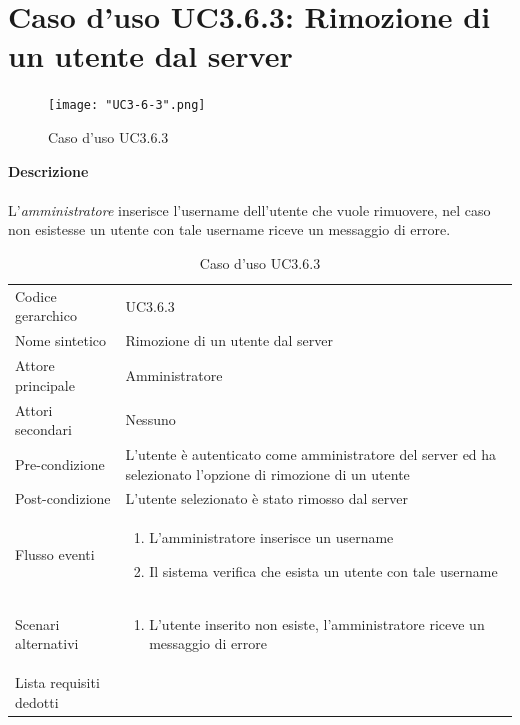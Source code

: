 \documentclass[a4paper]{report}
\begin{document}
	 \section{Caso d'uso UC3.6.3: Rimozione di un utente dal server}
	 \begin{figure}[H]
			\centering
			\texttt{[image: "UC3-6-3".png]}
			\caption{Caso d'uso UC3.6.3}
		\end{figure}
	 \textbf{Descrizione} \\ \\
	 L'\emph{amministratore} inserisce l'username dell'utente che vuole rimuovere, nel caso non esistesse
	  un utente con tale username riceve un messaggio di errore. \\
		\begin{table}[H]
		\begin{tabularx}{\textwidth}{X | X}\toprule
			\rowcolor{orange!65}Codice gerarchico & UC3.6.3 \\
			Nome sintetico & Rimozione di un utente dal server \\
			\rowcolor{orange!65}Attore principale & Amministratore\\
			Attori secondari & Nessuno \\
			\rowcolor{orange!65}Pre-condizione & L'utente è autenticato come amministratore del server ed
			 ha selezionato l'opzione di rimozione di un utente\\
			Post-condizione & L'utente selezionato è stato rimosso dal server\\
			\rowcolor{orange!65}Flusso eventi & \begin{enumerate}
			\item L'amministratore inserisce un username
			\item Il sistema verifica che esista un utente con tale username
			\end{enumerate} \\
			Scenari alternativi & \begin{enumerate}
			\item L'utente inserito non esiste, l'amministratore riceve un messaggio di errore
			\end{enumerate} \\
			\rowcolor{orange!65}Lista requisiti dedotti & \\
			\bottomrule
		\end{tabularx}
		\caption{Caso d'uso UC3.6.3}
	 \end{table}
\end{document}
